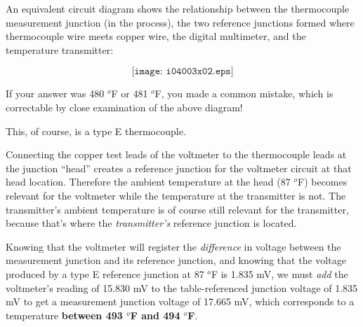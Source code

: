 An equivalent circuit diagram shows the relationship between the thermocouple measurement junction (in the process), the two reference junctions formed where thermocouple wire meets copper wire, the digital multimeter, and the temperature transmitter:

$$\texttt{[image: i04003x02.eps]}$$

If your answer was 480 $^{o}$F or 481 $^{o}$F, you made a common mistake, which is correctable by close examination of the above diagram!







This, of course, is a type E thermocouple.

\vskip 10pt

Connecting the copper test leads of the voltmeter to the thermocouple leads at the junction ``head'' creates a reference junction for the voltmeter circuit at that head location.  Therefore the ambient temperature at the head (87 $^{o}$F) becomes relevant for the voltmeter while the temperature at the transmitter is not.  The transmitter's ambient temperature is of course still relevant for the transmitter, because that's where the {\it transmitter's} reference junction is located.

Knowing that the voltmeter will register the {\it difference} in voltage between the measurement junction and its reference junction, and knowing that the voltage produced by a type E reference junction at 87 $^{o}$F is 1.835 mV, we must {\it add} the voltmeter's reading of 15.830 mV to the table-referenced junction voltage of 1.835 mV to get a measurement junction voltage of 17.665 mV, which corresponds to a temperature {\bf between 493 $^{o}$F and 494 $^{o}$F}.




